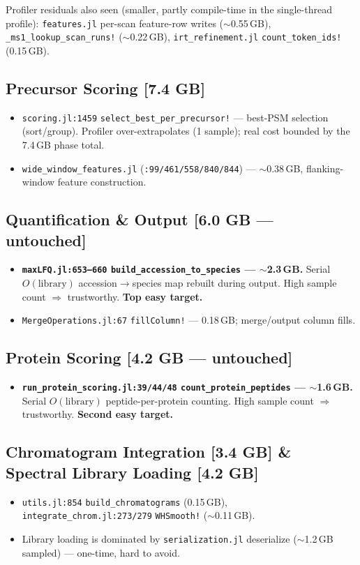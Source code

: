 \documentclass[11pt]{article}
\newcommand{\code}[1]{\texttt{\small #1}}
\begin{document}
\noindent Profiler residuals also seen (smaller, partly compile-time in the
single-thread profile): \code{features.jl} per-scan feature-row writes
($\sim$0.55\,GB), \code{\_ms1\_lookup\_scan\_runs!} ($\sim$0.22\,GB),
\code{irt\_refinement.jl} \code{count\_token\_ids!} (0.15\,GB).

\subsection*{Precursor Scoring [7.4 GB]}
\begin{itemize}
  \item \code{scoring.jl:1459} \code{select\_best\_per\_precursor!} --- best-PSM
  selection (sort/group). Profiler over-extrapolates (1 sample); real cost bounded
  by the 7.4\,GB phase total.
  \item \code{wide\_window\_features.jl} (\code{:99/461/558/840/844}) --- $\sim$0.38\,GB,
  flanking-window feature construction.
\end{itemize}

\subsection*{Quantification \& Output [6.0 GB --- untouched]}
\begin{itemize}
  \item \textcolor{lo}{\textbf{\code{maxLFQ.jl:653--660} \code{build\_accession\_to\_species} --- $\sim$2.3\,GB.}}
  Serial $O(\text{library})$ accession$\rightarrow$species map rebuilt during output.
  High sample count $\Rightarrow$ trustworthy. \textbf{Top easy target.}
  \item \code{MergeOperations.jl:67} \code{fillColumn!} --- 0.18\,GB; merge/output column fills.
\end{itemize}

\subsection*{Protein Scoring [4.2 GB --- untouched]}
\begin{itemize}
  \item \textcolor{lo}{\textbf{\code{run\_protein\_scoring.jl:39/44/48} \code{count\_protein\_peptides} --- $\sim$1.6\,GB.}}
  Serial $O(\text{library})$ peptide-per-protein counting. High sample count
  $\Rightarrow$ trustworthy. \textbf{Second easy target.}
\end{itemize}

\subsection*{Chromatogram Integration [3.4 GB] \& Spectral Library Loading [4.2 GB]}
\begin{itemize}
  \item \code{utils.jl:854} \code{build\_chromatograms} (0.15\,GB),
  \code{integrate\_chrom.jl:273/279} \code{WHSmooth!} ($\sim$0.11\,GB).
  \item Library loading is dominated by \code{serialization.jl} deserialize
  ($\sim$1.2\,GB sampled) --- one-time, hard to avoid.
\end{itemize}
\end{document}
